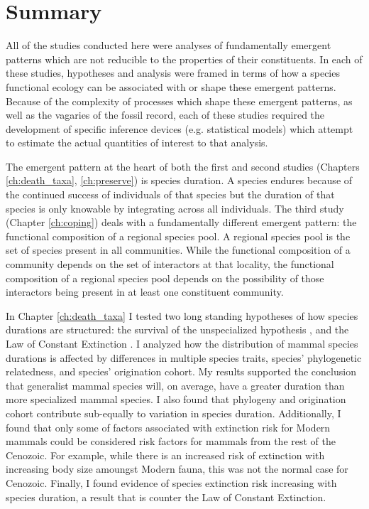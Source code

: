 \section{Summary}

All of the studies conducted here were analyses of fundamentally emergent patterns which are not reducible to the properties of their constituents. In each of these studies, hypotheses and analysis were framed in terms of how a species functional ecology can be associated with or shape these emergent patterns. Because of the complexity of processes which shape these emergent patterns, as well as the vagaries of the fossil record, each of these studies required the development of specific inference devices (e.g. statistical models) which attempt to estimate the actual quantities of interest to that analysis. 

The emergent pattern at the heart of both the first and second studies (Chapters \ref{ch:death_taxa}, \ref{ch:preserve}) is species duration. A species endures because of the continued success of individuals of that species but the duration of that species is only knowable by integrating across all individuals. The third study (Chapter \ref{ch:coping}) deals with a fundamentally different emergent pattern: the functional composition of a regional species pool. A regional species pool is the set of species present in all communities. While the functional composition of a community depends on the set of interactors at that locality, the functional composition of a regional species pool depends on the possibility of those interactors being present in at least one constituent community. 

In Chapter \ref{ch:death_taxa} I tested two long standing hypotheses of how species durations are structured: the survival of the unspecialized hypothesis \citep{Simpson1944}, and the Law of Constant Extinction \citep{VanValen1973}. I analyzed how the distribution of mammal species durations is affected by differences in multiple species traits, species' phylogenetic relatedness, and species' origination cohort. My results supported the conclusion that generalist mammal species will, on average, have a greater duration than more specialized mammal species. I also found that phylogeny and origination cohort contribute sub-equally to variation in species duration. Additionally, I found that only some of factors associated with extinction risk for Modern mammals could be considered risk factors for mammals from the rest of the Cenozoic. For example, while there is an increased risk of extinction with increasing body size amoungst Modern fauna, this was not the normal case for Cenozoic. Finally, I found evidence of species extinction risk increasing with species duration, a result that is counter the Law of Constant Extinction.

